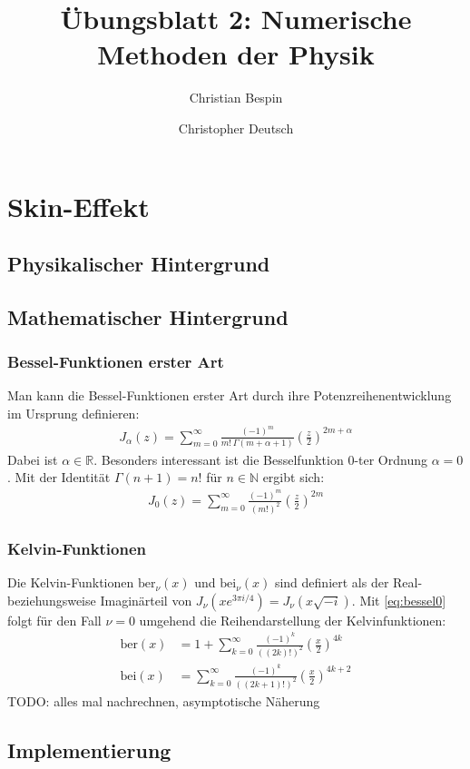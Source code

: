 \documentclass[10pt,a4paper]{article}
\author{Christian Bespin \and Christopher Deutsch}
\title{Übungsblatt 2: Numerische Methoden der Physik}
\begin{document}
\maketitle

\setcounter{section}{1}

\section{Skin-Effekt}

\subsection{Physikalischer Hintergrund}

\subsection{Mathematischer Hintergrund}

\subsubsection{Bessel-Funktionen erster Art}

Man kann die Bessel-Funktionen erster Art durch ihre Potenzreihenentwicklung im Ursprung definieren:
\begin{align}
	J_\alpha(z) = \sum^{\infty}_{m=0} \frac{\left( -1 \right)^m}{m! \, \Gamma(m + \alpha + 1)} \left(\frac{z}{2}\right)^{2m+\alpha}
\end{align}
Dabei ist $\alpha \in \mathbb{R}$. Besonders interessant ist die Besselfunktion 0-ter Ordnung $\alpha = 0$.
Mit der Identität $\Gamma(n+1) = n!$ für $n \in \mathbb{N}$ ergibt sich:
\begin{align}
	\label{eq:bessel0}
	J_0(z) = \sum^{\infty}_{m=0} \frac{\left( -1 \right)^m}{\left( m! \right)^2} \left( \frac{z}{2} \right)^{2m}
\end{align}


\subsubsection{Kelvin-Funktionen}

Die Kelvin-Funktionen $\mathrm{ber}_\nu(x)$ und $\mathrm{bei}_\nu(x)$ sind definiert als der Real-
beziehungsweise Imaginärteil von $J_\nu(x e^{3 \pi i / 4}) = J_\nu(x \sqrt{-i} )$. Mit \ref{eq:bessel0}
folgt für den Fall $\nu = 0$ umgehend die Reihendarstellung der Kelvinfunktionen:
\begin{align}
	\mathrm{ber}(x) &= 1 + \sum^{\infty}_{k=0} \frac{\left( -1 \right)^k}{\left( \left(2k\right)! \right)^2} \left( \frac{x}{2} \right)^{4k}\\
	\mathrm{bei}(x) &= \sum^{\infty}_{k=0} \frac{\left( -1 \right)^k}{\left( \left(2k+1\right)! \right)^2} \left( \frac{x}{2} \right)^{4k+2}
\end{align}
TODO: alles mal nachrechnen, asymptotische Näherung


\subsection{Implementierung}
\end{document}
